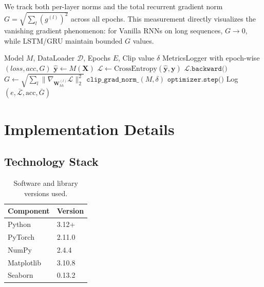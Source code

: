 \documentclass[12pt, a4paper]{article}
\begin{document}
We track both per-layer norms and the total recurrent gradient norm $G = \sqrt{\sum_l (g^{(l)})^2}$ across all epochs. This measurement directly visualizes the vanishing gradient phenomenon: for Vanilla RNNs on long sequences, $G \to 0$, while LSTM/GRU maintain bounded $G$ values.

\begin{algorithm}[H]
    \caption{Training with Gradient Dynamics Tracking}
    \label{alg:training}
    \begin{algorithmic}[1]
        \Require Model $M$, DataLoader $\mathcal{D}$, Epochs $E$, Clip value $\delta$
        \Ensure MetricsLogger with epoch-wise $(loss, acc, G)$
                \State $\hat{\mathbf{y}} \gets M(\mathbf{X})$ 
                \State $\mathcal{L} \gets \text{CrossEntropy}(\hat{\mathbf{y}}, \mathbf{y})$
                \State $\mathcal{L}.\texttt{backward()}$ 
                \State $G \gets \sqrt{\sum_l \| \nabla_{\mathbf{W}_{hh}^{(l)}} \mathcal{L} \|_2^2}$ 
                \State $\texttt{clip\_grad\_norm\_}(M, \delta)$
                \State $\texttt{optimizer.step()}$
            \EndFor
            \State Log$(e, \bar{\mathcal{L}}, \text{acc}, \bar{G})$
        \EndFor
    \end{algorithmic}
\end{algorithm}


\section{Implementation Details}

\subsection{Technology Stack}

\begin{table}[H]
    \centering
    \caption{Software and library versions used.}
    \label{tab:techstack}
    \begin{tabular}{ll}
        \toprule
        \textbf{Component} & \textbf{Version} \\
        \midrule
        Python & 3.12+ \\
        PyTorch & 2.11.0 \\
        NumPy & 2.4.4 \\
        Matplotlib & 3.10.8 \\
        Seaborn & 0.13.2 \\
        \bottomrule
    \end{tabular}
\end{table}
\end{document}
